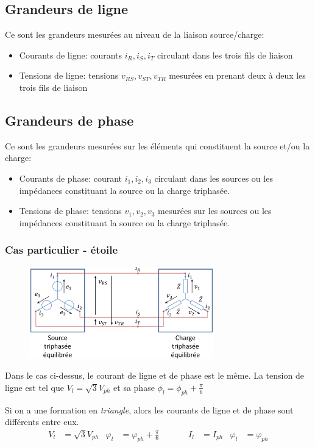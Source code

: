 \documentclass{report}
\begin{document}
\subsection{Grandeurs de ligne}
Ce sont les grandeurs mesurées au niveau de la liaison source/charge:
\begin{itemize}
\item Courants de ligne: courants $i_R, i_S, i_T$ circulant dans les trois fils de liaison
\item Tensions de ligne: tensions $v_{RS}, v_{ST}, v_{TR}$ mesurées en prenant deux à deux les trois fils de liaison 
\end{itemize}

\subsection{Grandeurs de phase}
Ce sont les grandeurs mesurées sur les éléments qui constituent la source et/ou la charge:
\begin{itemize}
\item Courants de phase: courant $i_1, i_2, i_3$ circulant dans les sources ou les impédances constituant la source ou la charge triphasée.
\item Tensions de phase: tensions $v_1, v_2, v_3$ mesurées sur les sources ou les impédances constituant la source ou la charge triphasée.
\end{itemize}

\subsubsection{Cas particulier - étoile}
\begin{figure}[H]
\centering
\includegraphics[width=8cm]{img/etoilesetoiles.png}
\end{figure}
Dans le cas ci-dessus, le courant de ligne et de phase est le même. La tension de ligne est tel que $V_l = \sqrt{3}V_{ph}$ et sa phase $\phi_l = \phi_{ph} + \frac{\pi}{6}$\par
Si on a une formation en \textit{triangle}, alors les courants de ligne et de phase sont différents entre eux.
\begin{align*}
V_l &= \sqrt{3} V_{ph} & \varphi_l &= \varphi_{ph} + \frac{\pi}{6} & &\quad & I_l &= I_{ph} & \varphi_l &= \varphi_{ph}
\end{align*}
\end{document}
